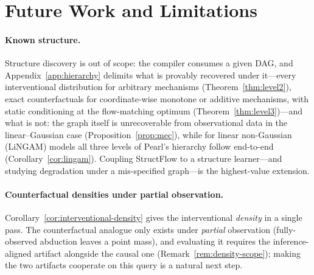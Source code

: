 \section{Future Work and Limitations}
\label{sec:future_work}

\paragraph{}

\paragraph{Known structure.}
Structure discovery is out of scope: the compiler consumes a given DAG, and Appendix~\ref{app:hierarchy} delimits what is provably recovered under it---every interventional distribution for arbitrary mechanisms (Theorem~\ref{thm:level2}), exact counterfactuals for coordinate-wise monotone or additive mechanisms, with static conditioning at the flow-matching optimum (Theorem~\ref{thm:level3})---and what is not: the graph itself is unrecoverable from observational data in the linear--Gaussian case (Proposition~\ref{prop:mec}), while for linear non-Gaussian (LiNGAM) models all three levels of Pearl's hierarchy follow end-to-end (Corollary~\ref{cor:lingam}). Coupling StructFlow to a structure learner---and studying degradation under a mis-specified graph---is the highest-value extension.

\paragraph{Counterfactual densities under partial observation.}
Corollary~\ref{cor:interventional-density} gives the interventional \emph{density} in a single pass. The counterfactual analogue only exists under \emph{partial} observation (fully-observed abduction leaves a point mass), and evaluating it requires the inference-aligned artifact alongside the causal one (Remark~\ref{rem:density-scope}); making the two artifacts cooperate on this query is a natural next step.

